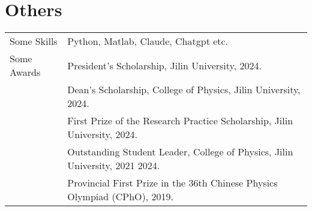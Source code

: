 \documentclass[a4paper,12pt]{article}
\begin{document}
\section{Others}
\begin{tabularx}{\linewidth}{@{}l X@{}}
Some Skills &  \normalsize{Python, Matlab, Claude, Chatgpt etc.}\\
Some Awards  &  \normalsize{President's Scholarship, Jilin University, 2024.} \\
&  \normalsize{Dean's Scholarship, College of Physics, Jilin University, 2024. }\\  
&  \normalsize{First Prize of the Research Practice Scholarship, Jilin University, 2024.}\\  
&  \normalsize{Outstanding Student Leader, College of Physics, Jilin University, 2021 2024.}\\
&  \normalsize{Provincial First Prize in the 36th Chinese Physics Olympiad (CPhO), 2019. }\\  

\end{tabularx}

\vfill
{}
\end{document}

